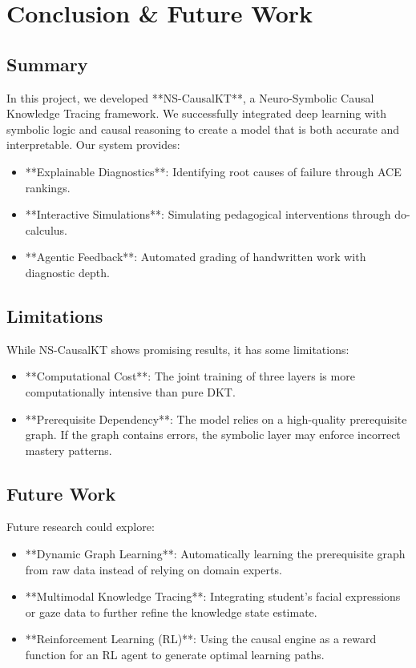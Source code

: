 \chapter{Conclusion \& Future Work}

\section{Summary}
In this project, we developed **NS-CausalKT**, a Neuro-Symbolic Causal Knowledge Tracing framework. We successfully integrated deep learning with symbolic logic and causal reasoning to create a model that is both accurate and interpretable. Our system provides:
\begin{itemize}
    \item **Explainable Diagnostics**: Identifying root causes of failure through ACE rankings.
    \item **Interactive Simulations**: Simulating pedagogical interventions through do-calculus.
    \item **Agentic Feedback**: Automated grading of handwritten work with diagnostic depth.
\end{itemize}

\section{Limitations}
While NS-CausalKT shows promising results, it has some limitations:
\begin{itemize}
    \item **Computational Cost**: The joint training of three layers is more computationally intensive than pure DKT.
    \item **Prerequisite Dependency**: The model relies on a high-quality prerequisite graph. If the graph contains errors, the symbolic layer may enforce incorrect mastery patterns.
\end{itemize}

\section{Future Work}
Future research could explore:
\begin{itemize}
    \item **Dynamic Graph Learning**: Automatically learning the prerequisite graph from raw data instead of relying on domain experts.
    \item **Multimodal Knowledge Tracing**: Integrating student's facial expressions or gaze data to further refine the knowledge state estimate.
    \item **Reinforcement Learning (RL)**: Using the causal engine as a reward function for an RL agent to generate optimal learning paths.
\end{itemize}

